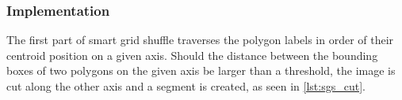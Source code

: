 \documentclass[10pt]{book}
\begin{document}
\subsubsection{Implementation}

The first part of smart grid shuffle traverses the polygon labels in order of their centroid position on a given axis. Should the distance between the bounding boxes of two polygons on the given axis be larger than a threshold, the image is cut along the other axis and a segment is created, as seen in \autoref{lst:sgs_cut}.







\end{document}
